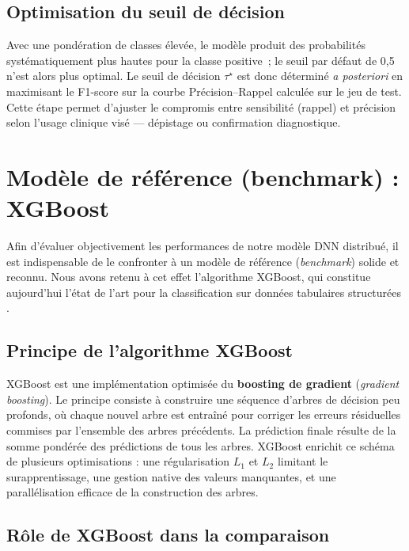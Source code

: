 \documentclass[12pt,a4paper]{report}
\begin{document}
\subsection{Optimisation du seuil de décision}

Avec une pondération de classes élevée, le modèle produit des probabilités
systématiquement plus hautes pour la classe positive~; le seuil par défaut de 0,5
n'est alors plus optimal. Le seuil de décision $\tau^\star$ est donc déterminé
\textit{a posteriori} en maximisant le F1-score sur la courbe Précision--Rappel
calculée sur le jeu de test. Cette étape permet d'ajuster le compromis entre
sensibilité (rappel) et précision selon l'usage clinique visé — dépistage ou
confirmation diagnostique.

\section{Modèle de référence (benchmark) : XGBoost}

Afin d'évaluer objectivement les performances de notre modèle \acs{DNN} distribué,
il est indispensable de le confronter à un modèle de référence (\textit{benchmark})
solide et reconnu. Nous avons retenu à cet effet l'algorithme \acf{XGBoost}, qui
constitue aujourd'hui l'état de l'art pour la classification sur données tabulaires
structurées \cite{chen2016}.

\subsection{Principe de l'algorithme XGBoost}

\acs{XGBoost} est une implémentation optimisée du \textbf{boosting de gradient}
(\textit{gradient boosting}). Le principe consiste à construire une séquence d'arbres
de décision peu profonds, où chaque nouvel arbre est entraîné pour corriger les
erreurs résiduelles commises par l'ensemble des arbres précédents. La prédiction
finale résulte de la somme pondérée des prédictions de tous les arbres. \acs{XGBoost}
enrichit ce schéma de plusieurs optimisations : une régularisation $L_1$ et $L_2$
limitant le surapprentissage, une gestion native des valeurs manquantes, et une
parallélisation efficace de la construction des arbres.

\subsection{Rôle de XGBoost dans la comparaison}
\end{document}
